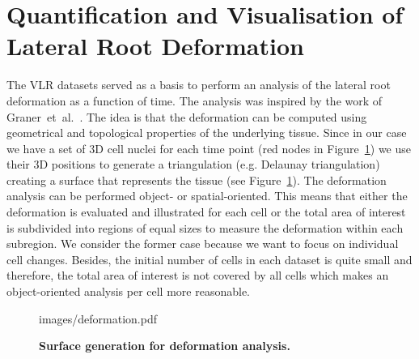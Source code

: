 \documentclass[11pt,a4paper, final]{article}
\begin{document}
\section{Quantification and Visualisation of Lateral Root Deformation}
\noindent
The VLR datasets served as a basis to perform an analysis of the lateral root deformation as a function of time. The analysis was inspired by the work of Graner~et~al.~\cite{graner_et_al_2008}. The idea is that the deformation can be computed using geometrical and topological properties of the underlying tissue. Since in our case we have a set of 3D cell nuclei for each time point (red nodes in Figure~\ref{fig:deformation}) we use their 3D positions to generate a triangulation (e.g. Delaunay triangulation) creating a surface that represents the tissue (see Figure~\ref{fig:deformation}). The deformation analysis can be performed object- or spatial-oriented. This means that either the deformation is evaluated and illustrated for each cell or the total area of interest is subdivided into regions of equal sizes to measure the deformation within each subregion. We consider the former case because we want to focus on individual cell changes. Besides, the initial number of cells in each dataset is quite small and therefore, the total area of interest is not covered by all cells which makes an object-oriented analysis per cell more reasonable.
%
\begin{figure}[htbp]
	\begin{center}
		\begin{overpic}[width=1.\linewidth]{images/deformation.pdf}
		\end{overpic}
\caption[]
{
{\bf Surface generation for deformation analysis.}
}
	\label{fig:deformation}
	\end{center}
\end{figure}
%
\end{document}
